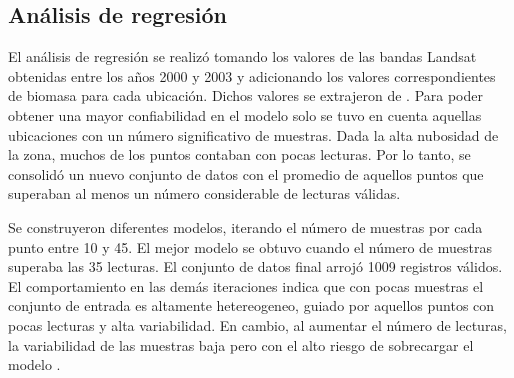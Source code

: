 \begin{table}
\caption{Datos obtenidos en en el proceso de procesamiento y limpieza  de datos}
\label{tab:datos}
\centering
{}
\end{table}

\subsection{Análisis de regresión}

El análisis de regresión se realizó tomando los valores de las bandas Landsat obtenidas entre los años 2000 y 2003 y adicionando los valores correspondientes de biomasa para cada ubicación.  Dichos valores  se extrajeron de \cite{baccini2008afirst}.  Para poder obtener una mayor confiabilidad en el modelo solo se tuvo en cuenta aquellas ubicaciones con un número significativo de muestras.  Dada la alta nubosidad de la zona, muchos de los puntos contaban con pocas lecturas.  Por lo tanto, se consolidó un nuevo conjunto de datos con el promedio de aquellos puntos que superaban al menos un número considerable de lecturas válidas.  

Se construyeron diferentes modelos, iterando el número de muestras por cada punto entre 10 y 45.  El mejor modelo se obtuvo cuando el número de muestras superaba las 35 lecturas.  El conjunto de datos final arrojó 1009 registros válidos.  El comportamiento en las demás iteraciones indica que con pocas muestras el conjunto de entrada es altamente hetereogeneo, guiado por aquellos puntos con pocas lecturas y alta variabilidad.  En cambio, al aumentar el número de lecturas, la variabilidad de las muestras baja pero con el alto riesgo de sobrecargar el modelo \cite{babyak_what_2004}. 

